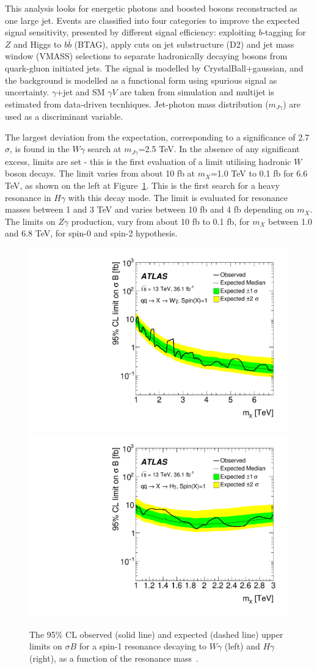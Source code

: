 \documentclass{PoS}
\begin{document}
This analysis looks for energetic photons and boosted bosons reconstructed as one large jet.
Events are classified into four categories to improve the expected signal sensitivity, presented by different signal efficiency:
exploiting $b$-tagging for $Z$ and Higgs to $b\bar{b}$ (BTAG), apply cuts on jet substructure (D2) and jet mass window (VMASS) selections to separate hadronically decaying bosons from quark-gluon initiated jets.
The signal is modelled by CrystalBall+gaussian, and the background is modelled as a functional form using spurious signal as uncertainty. $\gamma$+jet and SM $\gamma V$ are taken from simulation and multijet is estimated from data-driven tecnhiques.
Jet-photon mass distribution ($m_{J \gamma}$) are used as a discriminant variable. %

The largest deviation from the expectation, corresponding to a significance of 2.7$\sigma$, is found in the $W\gamma$ search at $m_{J \gamma}$=2.5 TeV.
In the absence of any significant excess, limits are set - this is the first evaluation of a limit utilising hadronic $W$ boson decays.
The limit varies from about 10 fb at $m_X$=1.0 TeV to 0.1 fb for 6.6 TeV, as shown on the left at Figure~\ref{fig:Wg_lim}. 
This is the first search for a heavy resonance in $H\gamma$ with this decay mode.
The limit is evaluated for resonance masses between 1 and 3 TeV and varies between 10 fb and 4 fb depending on $m_X$.
The limits on $Z\gamma$ production, vary from about 10 fb to 0.1 fb, for $m_X$ between 1.0 and 6.8 TeV, for spin-0 and spin-2 hypothesis. %

 \begin{figure}
     \includegraphics[width=.5\textwidth]{figures/lim_Wg_qqA1}
     \includegraphics[width=.5\textwidth]{figures/lim_Hg_qqA1}
     \caption{The 95\% CL observed (solid line) and expected (dashed line) upper limits on $\sigma B$ for a spin-1 resonance decaying to $W\gamma$ (left) and $H\gamma$ (right), as a function of the resonance mass~\cite{EXOT-2016-30}.}
     \label{fig:Wg_lim}
     \end{figure}
\end{document}

